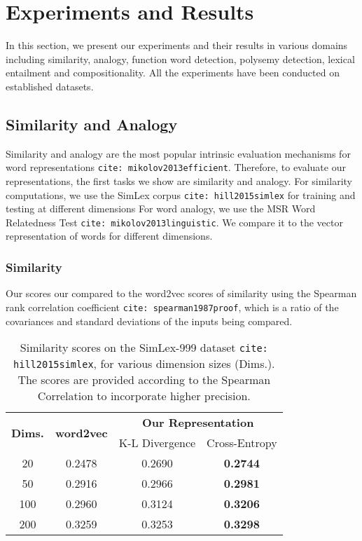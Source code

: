 \documentclass{book}
\newcommand{\citep}[1]{\texttt{cite: #1}}
\begin{document}

\section{Experiments and Results}
\label{sec: results}

In this section, we present our experiments and their results in various domains including similarity, analogy, function word detection, polysemy detection, lexical entailment and compositionality. All the experiments have been conducted on established datasets.

\subsection{Similarity and Analogy}
\label{ssec: sim-anal}

Similarity and analogy are the most popular intrinsic evaluation mechanisms for word representations \citep{mikolov2013efficient}. Therefore, to evaluate our representations, the first tasks we show are similarity and analogy. For similarity computations, we use the SimLex corpus \citep{hill2015simlex} for training and testing at different dimensions For word analogy, we use the MSR Word Relatedness Test \citep{mikolov2013linguistic}. We compare it to the vector representation of words for different dimensions.

\subsubsection{Similarity} 

Our scores our compared to the word2vec scores of similarity using the Spearman rank correlation coefficient \citep{spearman1987proof}, which is a ratio of the covariances and standard deviations of the inputs being compared. 

\begin{table}[]
    \centering
    {\small
    \begin{tabular}{c|c|cc}
        \multirow{2}{*}{\bf Dims.}   & \multirow{2}{*}{\bf word2vec} & \multicolumn{2}{c}{\bf Our Representation} \\ \cline{3-4}
                            &                               & K-L Divergence & Cross-Entropy \\\hline
        20  &   0.2478   & 0.2690 & \bf 0.2744    \\
        50  &   0.2916   & 0.2966 & \bf 0.2981    \\
        100 &   0.2960   & 0.3124 & \bf 0.3206    \\
        200 &   0.3259   & 0.3253 & \bf 0.3298    
    \end{tabular}
    }
    \caption{Similarity scores on the SimLex-999 dataset \citep{hill2015simlex}, for various dimension sizes (Dims.). The scores are provided according to the Spearman Correlation to incorporate higher precision.}
    \label{tab: similarity scores}
\end{table}
\end{document}
